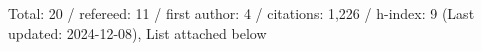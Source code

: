 Total: 20 / refereed: 11 / first author: 4 / citations: 1,226 / h-index: 9 (Last updated: 2024-12-08), List attached below